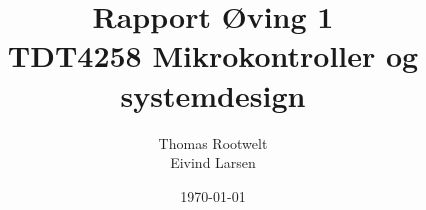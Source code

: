 \documentclass[a4paper,10pt]{article}
\title{Rapport Øving 1 \\ TDT4258 Mikrokontroller og systemdesign}
\author{Thomas Rootwelt\\Eivind Larsen}
\date{\today}
\begin{document}
\maketitle

\newpage	
\begin{abstract}

\end{abstract}

\newpage	
\tableofcontents
\newpage	






\end{document}
